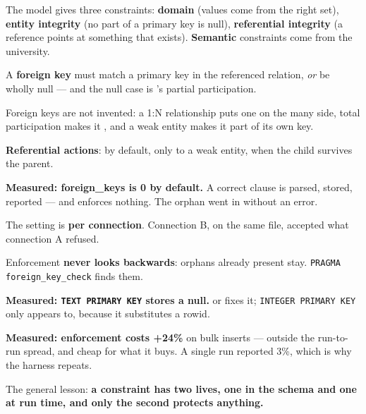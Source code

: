 \begin{chaptersummary}
\begin{tight}
  \item The model gives three constraints: \textbf{domain} (values come from
        the right set), \textbf{entity integrity} (no part of a primary key is
        null), \textbf{referential integrity} (a reference points at something
        that exists). \textbf{Semantic} constraints come from the university.
  \item A \textbf{foreign key} must match a primary key in the referenced
        relation, \emph{or} be wholly null --- and the null case is
        's partial participation.
  \item Foreign keys are not invented: a 1:N relationship puts one on the many
        side, total participation makes it , and a weak entity
        makes it part of its own key.
  \item \textbf{Referential actions}:  by default,
         only to a weak entity,  when the child
        survives the parent.
  \item \textbf{Measured:  foreign\_keys is 0 by default.} A
        correct  clause is parsed, stored, reported --- and
        enforces nothing. The orphan went in without an error.
  \item The setting is \textbf{per connection}. Connection B, on the same
        file, accepted what connection A refused.
  \item Enforcement \textbf{never looks backwards}: orphans already present
        stay. \texttt{PRAGMA foreign\_key\_check} finds them.
  \item \textbf{Measured: \texttt{TEXT PRIMARY KEY} stores a null.}
         or  fixes it; \texttt{INTEGER PRIMARY
        KEY} only appears to, because it substitutes a rowid.
  \item \textbf{Measured: enforcement costs +24\%} on bulk inserts --- outside
        the run-to-run spread, and cheap for what it buys. A single run
        reported 3\%, which is why the harness repeats.
  \item The general lesson: \textbf{a constraint has two lives, one in the
        schema and one at run time, and only the second protects anything.}
\end{tight}
\end{chaptersummary}

